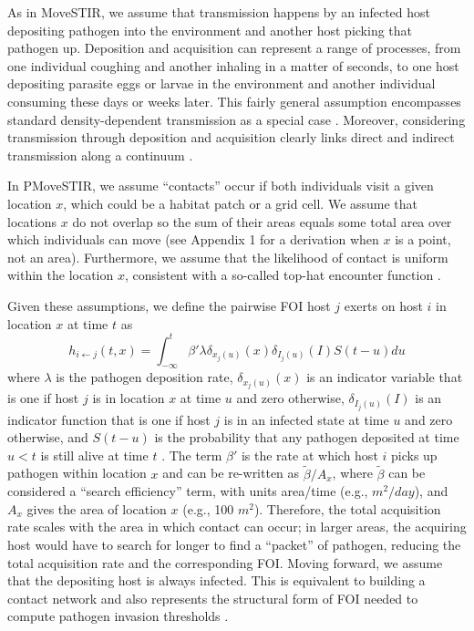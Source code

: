 \documentclass[letterpaper]{article}
\begin{document}
As in MoveSTIR, we assume that transmission happens by an infected host depositing pathogen into the environment and another host picking that pathogen up. 
Deposition and acquisition can represent a range of processes, from one individual coughing and another inhaling in a matter of seconds, to one host depositing parasite eggs or larvae in the environment and another individual consuming these days or weeks later. 
This fairly general assumption encompasses standard density-dependent transmission as a special case \citep{Cortez2021}. 
Moreover, considering transmission through deposition and acquisition clearly links direct and indirect transmission along a continuum \citep{Wilber2022}.

In PMoveSTIR, we assume ``contacts'' occur if both individuals visit a given location $x$, which could be a habitat patch or a grid cell. 
We assume that locations $x$ do not overlap so the sum of their areas equals some total area over which individuals can move (see Appendix 1 for a derivation when $x$ is a point, not an area). 
Furthermore, we assume that the likelihood of contact is uniform within the location $x$, consistent with a so-called top-hat encounter function \citep{Gurarie2013,Wilber2022}.

Given these assumptions, we define the pairwise FOI host $j$ exerts on host $i$ in location $x$ at time $t$ as \citep{Wilber2022}
\begin{equation}
    h_{i \leftarrow j}(t, x) = \int_{-\infty}^{t} \beta' \lambda \delta_{x_j(u)}(x) \delta_{I_j(u)}(I) S(t - u) du
    \label{eq:original_foi}
\end{equation}
where $\lambda$ is the pathogen deposition rate, $\delta_{x_j(u)}(x)$ is an indicator variable that is one if host $j$ is in location $x$ at time $u$ and zero otherwise, $\delta_{I_j(u)}(I)$ is an indicator function that is one if host $j$ is in an infected state at time $u$ and zero otherwise, and $S(t-u)$ is the probability that any pathogen deposited at time $u < t$ is still alive at time $t$ \citep[see][for a full derivation]{Wilber2022}. 
The term $\beta'$ is the rate at which host $i$ picks up pathogen within location $x$ and can be re-written as $\tilde{\beta} / A_x$, where $\tilde{\beta}$ can be considered a ``search efficiency'' term, with units area/time (e.g., $m^2 / day$), and $A_x$ gives the area of location $x$ (e.g., 100 $m^2$). 
Therefore, the total acquisition rate scales with the area in which contact can occur; in larger areas, the acquiring host would have to search for longer to find a ``packet'' of pathogen, reducing the total acquisition rate and the corresponding FOI. Moving forward, we assume that the depositing host is always infected. This is equivalent to building a contact network and also represents the structural form of FOI needed to compute pathogen invasion thresholds \citep{Wilber2022}.
\end{document}
